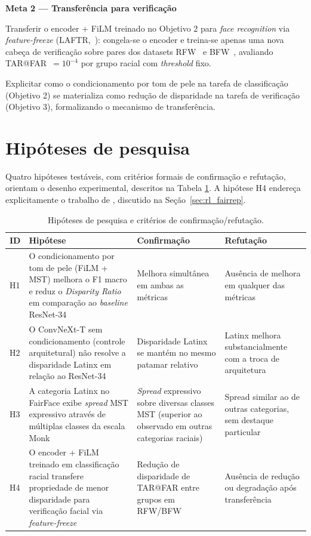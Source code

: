 \textbf{Meta 2 — Transferência para verificação}

\begin{description}[font=\bfseries\sffamily]
\item[Objetivo 3.] Transferir o encoder + FiLM treinado no Objetivo 2 para \emph{face recognition} via \emph{feature-freeze} (LAFTR,~): congela-se o encoder e treina-se apenas uma nova cabeça de verificação sobre pares dos datasets RFW~\cite{wang2019racial} e BFW~\cite{robinson2020face}, avaliando TAR@FAR~$= 10^{-4}$ por grupo racial com \emph{threshold} fixo.

\item[Objetivo 4.] Explicitar como o condicionamento por tom de pele na tarefa de classificação (Objetivo 2) se materializa como redução de disparidade na tarefa de verificação (Objetivo 3), formalizando o mecanismo de transferência.
\end{description}

\section{Hipóteses de pesquisa}
\label{sec:hipoteses}

Quatro hipóteses testáveis, com critérios formais de confirmação e refutação, orientam o desenho experimental, descritos na Tabela \ref{tab:hipoteses}. A hipótese H4 endereça explicitamente o trabalho de , discutido na Seção~\ref{sec:rl_fairrep}.

\begin{table}[htbp]
\centering
\small
\begin{tabular}{p{0.5cm}p{5.5cm}p{4cm}p{4cm}}
\toprule
\textbf{ID} & \textbf{Hipótese} & \textbf{Confirmação} & \textbf{Refutação} \\
\midrule
H1 & O condicionamento por tom de pele (FiLM + MST) melhora o F1 macro e reduz o \emph{Disparity Ratio} em comparação ao \emph{baseline} ResNet-34 & Melhora simultânea em ambas as métricas & Ausência de melhora em qualquer das métricas \\
H2 & O ConvNeXt-T sem condicionamento (controle arquitetural) não resolve a disparidade Latinx em relação ao ResNet-34 & Disparidade Latinx se mantém no mesmo patamar relativo & Latinx melhora substancialmente com a troca de arquitetura \\
H3 & A categoria Latinx no FairFace exibe \emph{spread} MST expressivo através de múltiplas classes da escala Monk & \emph{Spread} expressivo sobre diversas classes MST (superior ao observado em outras categorias raciais) & Spread similar ao de outras categorias, sem destaque particular \\
H4 & O encoder + FiLM treinado em classificação racial transfere propriedade de menor disparidade para verificação facial via \emph{feature-freeze} & Redução de disparidade de TAR@FAR entre grupos em RFW/BFW & Ausência de redução ou degradação após transferência \\
\bottomrule
\end{tabular}
\caption{Hipóteses de pesquisa e critérios de confirmação/refutação.}
\label{tab:hipoteses}
\end{table}

